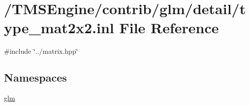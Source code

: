 \hypertarget{type__mat2x2_8inl}{}\section{/\+T\+M\+S\+Engine/contrib/glm/detail/type\+\_\+mat2x2.inl File Reference}
\label{type__mat2x2_8inl}
{\ttfamily \#include \char`\"{}../matrix.\+hpp\char`\"{}}\newline
\subsection*{Namespaces}
\begin{DoxyCompactItemize}
\item 
 \hyperlink{namespaceglm}{glm}
\end{DoxyCompactItemize}
